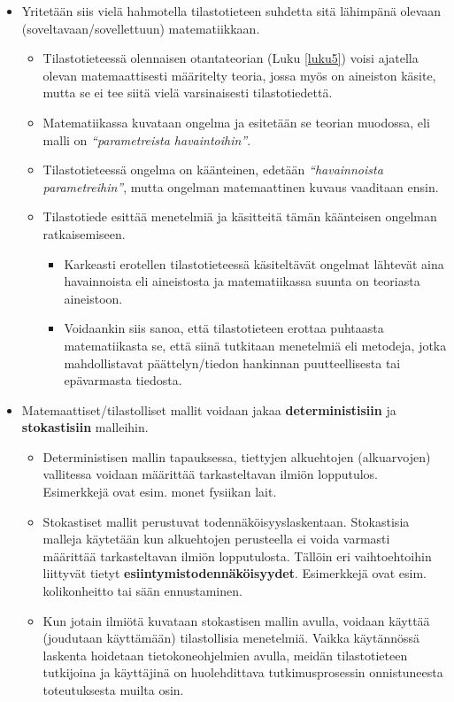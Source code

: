 \documentclass[
]{book}
\providecommand{\tightlist}{%
  \setlength{\itemsep}{0pt}\setlength{\parskip}{0pt}}
\begin{document}
\begin{itemize}
\tightlist
\item
  Yritetään siis vielä hahmotella tilastotieteen suhdetta sitä lähimpänä olevaan (soveltavaan/sovellettuun) matematiikkaan.

  \begin{itemize}
  \tightlist
  \item
    Tilastotieteessä olennaisen otantateorian (Luku \ref{luku5}) voisi ajatella olevan matemaattisesti määritelty teoria, jossa myös on aineiston käsite, mutta se ei tee siitä vielä varsinaisesti tilastotiedettä.
  \item
    Matematiikassa kuvataan ongelma ja esitetään se teorian muodossa, eli malli on \emph{``parametreista havaintoihin''}.
  \item
    Tilastotieteessä ongelma on käänteinen, edetään \emph{``havainnoista parametreihin''}, mutta ongelman matemaattinen kuvaus vaaditaan ensin.
  \item
    Tilastotiede esittää menetelmiä ja käsitteitä tämän käänteisen ongelman ratkaisemiseen.

    \begin{itemize}
    \tightlist
    \item
      Karkeasti erotellen tilastotieteessä käsiteltävät ongelmat lähtevät aina havainnoista eli aineistosta ja matematiikassa suunta on teoriasta aineistoon.
    \item
      Voidaankin siis sanoa, että tilastotieteen erottaa puhtaasta matematiikasta se, että siinä tutkitaan menetelmiä eli metodeja, jotka mahdollistavat päättelyn/tiedon hankinnan puutteellisesta tai epävarmasta tiedosta.
    \end{itemize}
  \end{itemize}
\item
  Matemaattiset/tilastolliset mallit voidaan jakaa \textbf{deterministisiin} ja \textbf{stokastisiin} malleihin.

  \begin{itemize}
  \tightlist
  \item
    Deterministisen mallin tapauksessa, tiettyjen alkuehtojen (alkuarvojen) vallitessa voidaan määrittää tarkasteltavan ilmiön lopputulos. Esimerkkejä ovat esim. monet fysiikan lait.
  \item
    Stokastiset mallit perustuvat todennäköisyyslaskentaan. Stokastisia malleja käytetään kun alkuehtojen perusteella ei voida varmasti määrittää tarkasteltavan ilmiön lopputulosta. Tällöin eri vaihtoehtoihin liittyvät tietyt \textbf{esiintymistodennäköisyydet}. Esimerkkejä ovat esim. kolikonheitto tai sään ennustaminen.
  \item
    Kun jotain ilmiötä kuvataan stokastisen mallin avulla, voidaan käyttää (joudutaan käyttämään) tilastollisia menetelmiä. Vaikka käytännössä laskenta hoidetaan tietokoneohjelmien avulla, meidän tilastotieteen tutkijoina ja käyttäjinä on huolehdittava tutkimusprosessin onnistuneesta toteutuksesta muilta osin.
  \end{itemize}
\end{itemize}
\end{document}
